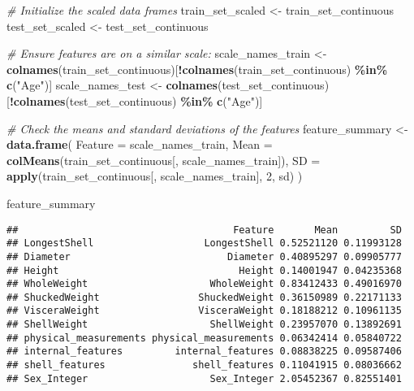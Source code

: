 \documentclass[
]{article}
\newenvironment{Shaded}{\begin{snugshade}}{\end{snugshade}}
\newcommand{\AttributeTok}[1]{\textcolor[rgb]{0.13,0.29,0.53}{#1}}
\newcommand{\CommentTok}[1]{\textcolor[rgb]{0.56,0.35,0.01}{\textit{#1}}}
\newcommand{\DecValTok}[1]{\textcolor[rgb]{0.00,0.00,0.81}{#1}}
\newcommand{\FunctionTok}[1]{\textcolor[rgb]{0.13,0.29,0.53}{\textbf{#1}}}
\newcommand{\NormalTok}[1]{#1}
\newcommand{\OtherTok}[1]{\textcolor[rgb]{0.56,0.35,0.01}{#1}}
\newcommand{\SpecialCharTok}[1]{\textcolor[rgb]{0.81,0.36,0.00}{\textbf{#1}}}
\newcommand{\StringTok}[1]{\textcolor[rgb]{0.31,0.60,0.02}{#1}}
\begin{document}
\begin{Shaded}
\begin{Highlighting}[]
\CommentTok{\# Initialize the scaled data frames}
\NormalTok{train\_set\_scaled }\OtherTok{\textless{}{-}}\NormalTok{ train\_set\_continuous}
\NormalTok{test\_set\_scaled }\OtherTok{\textless{}{-}}\NormalTok{ test\_set\_continuous}

\CommentTok{\# Ensure features are on a similar scale:}
\NormalTok{scale\_names\_train }\OtherTok{\textless{}{-}} \FunctionTok{colnames}\NormalTok{(train\_set\_continuous)[}\SpecialCharTok{!}\FunctionTok{colnames}\NormalTok{(train\_set\_continuous) }\SpecialCharTok{\%in\%} \FunctionTok{c}\NormalTok{(}\StringTok{"Age"}\NormalTok{)]}
\NormalTok{scale\_names\_test }\OtherTok{\textless{}{-}} \FunctionTok{colnames}\NormalTok{(test\_set\_continuous)[}\SpecialCharTok{!}\FunctionTok{colnames}\NormalTok{(test\_set\_continuous) }\SpecialCharTok{\%in\%} \FunctionTok{c}\NormalTok{(}\StringTok{"Age"}\NormalTok{)]}

\CommentTok{\# Check the means and standard deviations of the features}
\NormalTok{feature\_summary }\OtherTok{\textless{}{-}} \FunctionTok{data.frame}\NormalTok{(}
  \AttributeTok{Feature =}\NormalTok{ scale\_names\_train,}
  \AttributeTok{Mean =} \FunctionTok{colMeans}\NormalTok{(train\_set\_continuous[, scale\_names\_train]),}
  \AttributeTok{SD =} \FunctionTok{apply}\NormalTok{(train\_set\_continuous[, scale\_names\_train], }\DecValTok{2}\NormalTok{, sd)}
\NormalTok{)}

\NormalTok{feature\_summary}
\end{Highlighting}
\end{Shaded}

\begin{verbatim}
##                                     Feature       Mean         SD
## LongestShell                   LongestShell 0.52521120 0.11993128
## Diameter                           Diameter 0.40895297 0.09905777
## Height                               Height 0.14001947 0.04235368
## WholeWeight                     WholeWeight 0.83412433 0.49016970
## ShuckedWeight                 ShuckedWeight 0.36150989 0.22171133
## VisceraWeight                 VisceraWeight 0.18188212 0.10961135
## ShellWeight                     ShellWeight 0.23957070 0.13892691
## physical_measurements physical_measurements 0.06342414 0.05840722
## internal_features         internal_features 0.08838225 0.09587406
## shell_features               shell_features 0.11041915 0.08036662
## Sex_Integer                     Sex_Integer 2.05452367 0.82551401
\end{verbatim}
\end{document}
